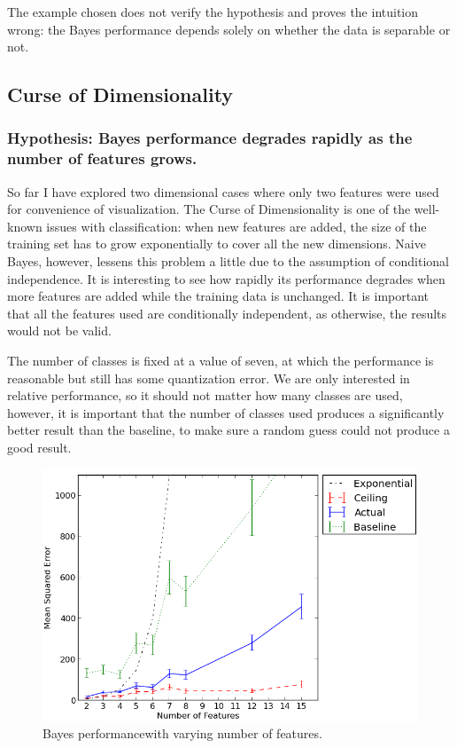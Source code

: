 \documentclass[12pt,notitlepage,twoside]{scrbook}
\begin{document}
The example chosen does not verify the hypothesis and proves the intuition wrong: the
Bayes performance depends solely on whether the data is separable or not.

\subsection{Curse of Dimensionality}
\subsubsection*{Hypothesis: Bayes performance degrades rapidly as the number of features grows.}
So far I have explored two dimensional cases where only two features were used for
convenience of visualization. The Curse of Dimensionality is one of the well-known issues with
classification: when new features are added, the size of the training set has to grow
exponentially to cover all the new dimensions. Naive Bayes, however, lessens this problem
a little due to the assumption of conditional independence. It is interesting to see how
rapidly its performance degrades when more features are added while the training data is
unchanged. It is important that all the features used are conditionally independent, as
otherwise, the results would not be valid. 

The number of classes is fixed at a value of seven, at which the performance is
reasonable but still has some quantization error. We are only interested in
relative performance, so it should not matter how many classes are used,
however, it is important that the number of classes used produces a
significantly better result than the baseline, to make sure a random guess
could not produce a good result.

\begin{figure}[h!]
  \centering
  \includegraphics[width=0.8\linewidth]{figs/feats.png}
  \caption{Bayes performancewith varying number of features.\label{feats}}
\end{figure}
\end{document}
